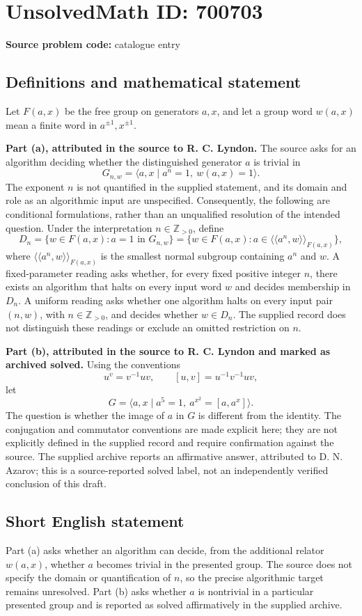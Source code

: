 \documentclass[11pt]{article}
\newcommand{\Z}{\mathbb{Z}}
\begin{document}
\section*{UnsolvedMath ID: 700703}
\textbf{Source problem code:} catalogue entry
\subsection{Definitions and mathematical statement}
Let \(F(a,x)\) be the free group on generators \(a,x\), and let a group word \(w(a,x)\) mean a finite word in \(a^{\pm1},x^{\pm1}\).

\textbf{Part (a), attributed in the source to R. C. Lyndon.} The source asks for an algorithm deciding whether the distinguished generator \(a\) is trivial in
\[
G_{n,w}=\langle a,x\mid a^n=1,\ w(a,x)=1\rangle.
\]
The exponent \(n\) is not quantified in the supplied statement, and its domain and role as an algorithmic input are unspecified. Consequently, the following are conditional formulations, rather than an unqualified resolution of the intended question. Under the interpretation \(n\in\Z_{>0}\), define
\[
D_n=\{w\in F(a,x):a=1\text{ in }G_{n,w}\}
=\{w\in F(a,x):a\in\langle\!\langle a^n,w\rangle\!\rangle_{F(a,x)}\},
\]
where \(\langle\!\langle a^n,w\rangle\!\rangle_{F(a,x)}\) is the smallest normal subgroup containing \(a^n\) and \(w\). A fixed-parameter reading asks whether, for every fixed positive integer \(n\), there exists an algorithm that halts on every input word \(w\) and decides membership in \(D_n\). A uniform reading asks whether one algorithm halts on every input pair \((n,w)\), with \(n\in\Z_{>0}\), and decides whether \(w\in D_n\). The supplied record does not distinguish these readings or exclude an omitted restriction on \(n\).

\textbf{Part (b), attributed in the source to R. C. Lyndon and marked as archived solved.} Using the conventions
\[
u^v=v^{-1}uv,\qquad [u,v]=u^{-1}v^{-1}uv,
\]
let
\[
G=\langle a,x\mid a^5=1,\ a^{x^2}=[a,a^x]\rangle.
\]
The question is whether the image of \(a\) in \(G\) is different from the identity. The conjugation and commutator conventions are made explicit here; they are not explicitly defined in the supplied record and require confirmation against the source. The supplied archive reports an affirmative answer, attributed to D. N. Azarov; this is a source-reported solved label, not an independently verified conclusion of this draft.
\subsection{Short English statement}
Part (a) asks whether an algorithm can decide, from the additional relator \(w(a,x)\), whether \(a\) becomes trivial in the presented group. The source does not specify the domain or quantification of \(n\), so the precise algorithmic target remains unresolved. Part (b) asks whether \(a\) is nontrivial in a particular presented group and is reported as solved affirmatively in the supplied archive.
\end{document}
